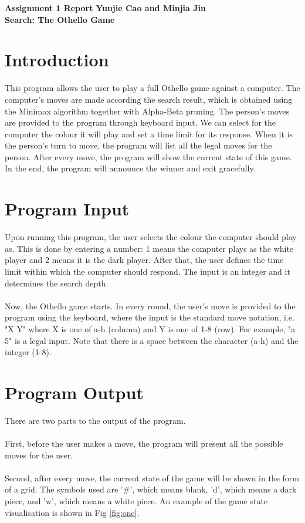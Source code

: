 \documentclass[a4paper, 11pt]{article}
\begin{document}
\noindent
\large\textbf{Assignment 1 Report} \hfill \textbf{Yunjie Cao and Minjia Jin}\\

\large\textbf{Search: The Othello Game}

\section*{Introduction}
This program allows the user to play a full Othello game against a computer. The computer's moves are made according the search result, which is obtained using the Minimax algorithm together with Alpha-Beta pruning. The person's moves are provided to the program through keyboard input. We can select for the computer the colour it will play and set a time limit for its response. When it is the person's turn to move, the program will list all the legal moves for the person. After every move, the program will show the current state of this game. In the end, the program will announce the winner and exit gracefully.

\section*{Program Input}
Upon running this program, the user selects the colour the computer should play as. This is done by entering a number: 1 means the computer plays as the white player and 2 means it is the dark player. After that, the user defines the time limit within which the computer should respond. The input is an integer and it determines the search depth.
\\
\\
Now, the Othello game starts. In every round, the user's move is provided to the program using the keyboard, where the input is the standard move notation, i.e. "X Y" where X is one of a-h (column) and Y is one of 1-8 (row). For example, "a 5" is a legal input. Note that there is a space between the character (a-h) and the integer (1-8).

\section*{Program Output}
There are two parts to the output of the program.
\\
\\
First, before the user makes a move, the program will present all the possible moves for the user.
\\\\
Second, after every move, the current state of the game will be shown in the form of a grid. The symbols used are '\#', which means blank, 'd', which means a dark piece, and 'w', which means a white piece. An example of the game state visualisation is shown in Fig \ref{fig:one}.
\end{document}
